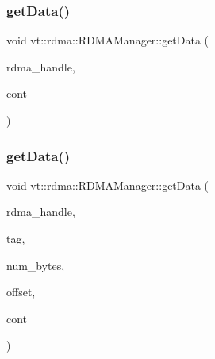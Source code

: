\mbox{\label{structvt_1_1rdma_1_1_r_d_m_a_manager_aebefa1395f990efb66284adc1495f6d4}} 
\subsubsection{\texorpdfstring{get\+Data()}{getData()}\hspace{0.1cm}{\footnotesize\ttfamily [1/2]}}
{\footnotesize\ttfamily void vt\+::rdma\+::\+R\+D\+M\+A\+Manager\+::get\+Data (\begin{DoxyParamCaption}\item[{\hyperlink{namespacevt_a10442579ec4e7ebef223818e64bcf908}{R\+D\+M\+A\+\_\+\+Handle\+Type} const \&}]{rdma\+\_\+handle,  }\item[{\hyperlink{namespacevt_1_1rdma_aa07fa86d8eca8853254b40fc0e565726}{R\+D\+M\+A\+\_\+\+Recv\+Type}}]{cont }\end{DoxyParamCaption})\hspace{0.3cm}{\ttfamily [inline]}}

\mbox{\label{structvt_1_1rdma_1_1_r_d_m_a_manager_a214cf0d741a5dd197e12a3fcd6ea2c47}} 
\subsubsection{\texorpdfstring{get\+Data()}{getData()}\hspace{0.1cm}{\footnotesize\ttfamily [2/2]}}
{\footnotesize\ttfamily void vt\+::rdma\+::\+R\+D\+M\+A\+Manager\+::get\+Data (\begin{DoxyParamCaption}\item[{\hyperlink{namespacevt_a10442579ec4e7ebef223818e64bcf908}{R\+D\+M\+A\+\_\+\+Handle\+Type} const \&}]{rdma\+\_\+handle,  }\item[{\hyperlink{namespacevt_a84ab281dae04a52a4b243d6bf62d0e52}{Tag\+Type} const \&}]{tag,  }\item[{\hyperlink{namespacevt_aab8d55968084610ce3b17057981e9300}{Byte\+Type} const \&}]{num\+\_\+bytes,  }\item[{\hyperlink{namespacevt_aab8d55968084610ce3b17057981e9300}{Byte\+Type} const \&}]{offset,  }\item[{\hyperlink{namespacevt_1_1rdma_aa07fa86d8eca8853254b40fc0e565726}{R\+D\+M\+A\+\_\+\+Recv\+Type}}]{cont }\end{DoxyParamCaption})}

